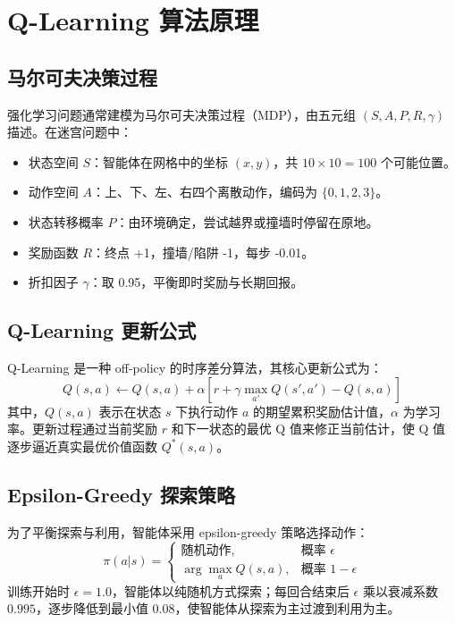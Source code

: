 \documentclass[UTF8,12pt,a4paper]{ctexart}
\begin{document}
\section{Q-Learning 算法原理}

\subsection{马尔可夫决策过程}
强化学习问题通常建模为马尔可夫决策过程（MDP），由五元组 $(S, A, P, R, \gamma)$ 描述。在迷宫问题中：
\begin{itemize}
    \item 状态空间 $S$：智能体在网格中的坐标 $(x, y)$，共 $10 \times 10 = 100$ 个可能位置。
    \item 动作空间 $A$：上、下、左、右四个离散动作，编码为 $\{0, 1, 2, 3\}$。
    \item 状态转移概率 $P$：由环境确定，尝试越界或撞墙时停留在原地。
    \item 奖励函数 $R$：终点 +1，撞墙/陷阱 -1，每步 -0.01。
    \item 折扣因子 $\gamma$：取 0.95，平衡即时奖励与长期回报。
\end{itemize}

\subsection{Q-Learning 更新公式}
Q-Learning 是一种 off-policy 的时序差分算法，其核心更新公式为：
\begin{equation}
Q(s, a) \leftarrow Q(s, a) + \alpha \left[ r + \gamma \max_{a'} Q(s', a') - Q(s, a) \right]
\end{equation}
其中，$Q(s, a)$ 表示在状态 $s$ 下执行动作 $a$ 的期望累积奖励估计值，$\alpha$ 为学习率。更新过程通过当前奖励 $r$ 和下一状态的最优 Q 值来修正当前估计，使 Q 值逐步逼近真实最优价值函数 $Q^*(s, a)$。

\subsection{Epsilon-Greedy 探索策略}
为了平衡探索与利用，智能体采用 epsilon-greedy 策略选择动作：
\begin{equation}
\pi(a|s) = \begin{cases}
\text{随机动作}, & \text{概率 } \epsilon \\
\arg\max_a Q(s, a), & \text{概率 } 1 - \epsilon
\end{cases}
\end{equation}
训练开始时 $\epsilon = 1.0$，智能体以纯随机方式探索；每回合结束后 $\epsilon$ 乘以衰减系数 $0.995$，逐步降低到最小值 $0.08$，使智能体从探索为主过渡到利用为主。
\end{document}

